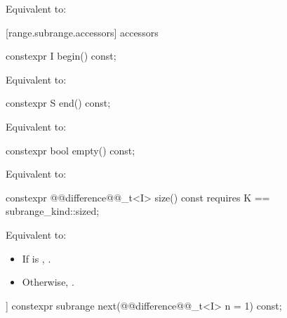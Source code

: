 {\begin{itemdescr}
\pnum
\effects Equivalent to: 
\end{itemdescr}

[range.subrange.accessors]{ accessors}

%
\begin{itemdecl}
constexpr I begin() const;
\end{itemdecl}

\begin{itemdescr}
\pnum
\effects Equivalent to: 
\end{itemdescr}

%
\begin{itemdecl}
constexpr S end() const;
\end{itemdecl}

\begin{itemdescr}
\pnum
\effects Equivalent to: 
\end{itemdescr}

%
\begin{itemdecl}
constexpr bool empty() const;
\end{itemdecl}

\begin{itemdescr}
\pnum
\effects Equivalent to: 
\end{itemdescr}

%
\begin{itemdecl}
constexpr @@difference@@_t<I> size() const
  requires K == subrange_kind::sized;
\end{itemdecl}

\begin{itemdescr}
\pnum
\effects Equivalent to: 
\begin{itemize}
\item If  is , .
\item Otherwise, .
\end{itemize}
\end{itemdescr}

%
\begin{itemdecl}
[[nodiscard]] constexpr subrange next(@@difference@@_t<I> n = 1) const;
\end{itemdecl}

}
